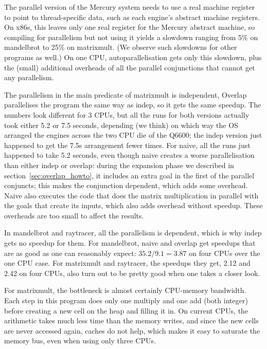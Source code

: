 The parallel version of the Mercury system
needs to use a real machine register
to point to thread-specific data,
such as each engine's abstract machine registers.
On x86s, this leaves only one real register for the Mercury abstract machine,
so compiling for parallelism but not using it
yields a slowdown ranging from 5\% on mandelbrot to 25\% on matrixmult.
(We observe such slowdowns for other programs as well.)
On one CPU, autoparallelisation gets only this slowdown,
plus the (small) additional overheads of all the parallel conjunctions
that cannot get any parallelism.

The parallelism in the main predicate of matrixmult is independent,
Overlap parallelises the program the same way as indep,
so it gets the same speedup.
The numbers look different for 3 CPUs,
but all the runs for both versions actually took either 5.2 or 7.5 seconds,
depending (we think) on which way
the OS arranged the engines across the two CPU die of the Q6600;
the indep version just happened to get the 7.5s arrangement fewer times.
For naive, all the runs just happened to take 5.2 seconds,
even though naive creates a worse parallelisation than either indep or overlap:
during the expansion phase we described in section~\ref{sec:overlap_howto},
it includes an extra goal in the first of the parallel conjuncts;
this makes the conjunction dependent, which adds some overhead.
Naive also executes the code that does the matrix multiplication
in parallel with the goals that create its inputs,
which also adds overhead without speedup.
These overheads are too small to affect the results.

In mandelbrot and raytracer, all the parallelism is dependent,
which is why indep gets no speedup for them.
For mandelbrot, naive and overlap get speedups
that are as good as one can reasonably expect:
$35.2/9.1 = 3.87$ on four CPUs over the one CPU case.
For matrixmult and raytracer, the speedups they get,
2.12 and 2.42 on four CPUs,
also turn out to be pretty good when one takes a closer look.

For matrixmult, the bottleneck is almost certainly CPU-memory bandwidth.
Each step in this program does only one multiply and one add (both integer)
before creating a new cell on the heap and filling it in.
On current CPUs, the arithmetic takes much less time than the memory writes,
and since the new cells are never accessed again, caches do not help,
which makes it easy to saturate the memory bus, even when using only three CPUs.

